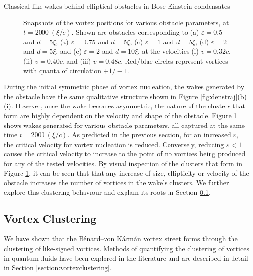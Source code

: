 \begin{chapter}{\label{cha:wake}Classical-like wakes behind elliptical obstacles in Bose-Einstein condensates}
\begin{figure}
{\begin{minipage}{0.4\linewidth}
%
\end{minipage}%
}
\caption{\label{fig:3x3grid}Snapshots of the vortex positions for various obstacle parameters, at $t=2000~(\xi/c)$. Shown are obstacles corresponding to (a) $\varepsilon=0.5$ and $d=5\xi$, (a) $\varepsilon=0.75$ and $d=5\xi$, (c) $\varepsilon=1$ and $d=5\xi$, (d) $\varepsilon=2$ and $d=5\xi$, and (e) $\varepsilon=2$ and $d=10\xi$, at the velocities (i) $v=0.32c$, (ii) $v=0.40c$, and (iii) $v=0.48c$.  Red/blue circles represent vortices with quanta of circulation $+1/-1$.}
\end{figure}
During the initial symmetric phase of vortex nucleation, the wakes generated by the obstacle have the same qualitative structure shown in Figure \ref{fig:denstraj}(b) (i).  However, once the wake becomes asymmetric, the nature of the clusters that form are highly dependent on the velocity and shape of the obstacle. Figure \ref{fig:3x3grid} shows wakes generated for various obstacle parameters, all captured at the same time $t=2000~(\xi/c)$. As predicted in the previous section, for an increased $\varepsilon$, the critical velocity for vortex nucleation is reduced. Conversely, reducing $\varepsilon<1$ causes the critical velocity to increase to the point of no vortices being produced for any of the tested velocities. By visual inspection of the clusters that form in Figure \ref{fig:3x3grid}, it can be seen that that any increase of size, ellipticity or velocity of the obstacle increases the number of vortices in the wake's clusters. We further explore this clustering behaviour and explain its roots in Section \ref{sec:clusteringwake}.

\subsection{Vortex Clustering}\label{sec:clusteringwake}
We have shown that the B\'enard--von K\'arm\'an vortex street forms through the clustering of like-signed vortices. Methods of quantifying the clustering of vortices in quantum fluids have been explored in the literature \cite{white12,reeves_billam_13,bagg12} and are described in detail in Section \ref{section:vortexclustering}.


\end{chapter}
